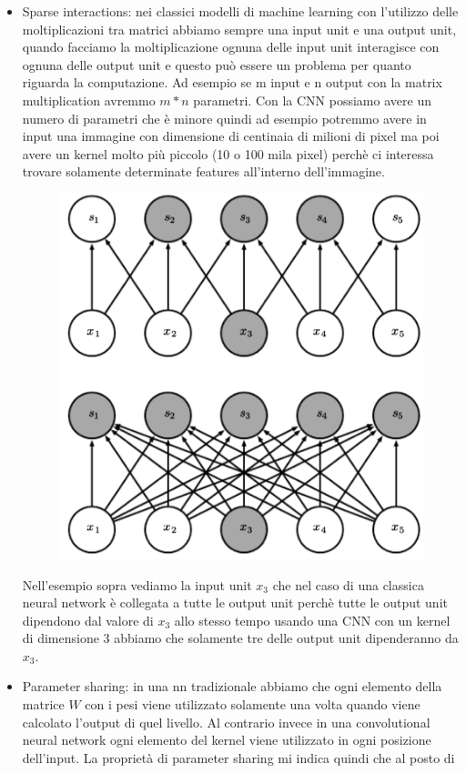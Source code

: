 \documentclass[14pt]{extreport}
\begin{document}
\begin{itemize}
	\item Sparse interactions: nei classici modelli di machine learning con l'utilizzo delle moltiplicazioni tra matrici 
	abbiamo sempre una input unit e una output unit, quando facciamo la moltiplicazione ognuna delle input unit interagisce con ognuna delle 
	output unit e questo può essere un problema per quanto riguarda la computazione.
	Ad esempio se m input e n output con la matrix multiplication avremmo $m*n$ parametri. 
	Con la CNN possiamo avere un numero di parametri che è minore quindi ad esempio potremmo avere in input una immagine con dimensione di centinaia di milioni
	di pixel ma poi avere un kernel molto più piccolo (10 o 100 mila pixel) perchè ci interessa trovare solamente determinate features all'interno dell'immagine.
	\begin{figure}[H]
		\centering
		\includegraphics[width=0.7\linewidth]{411.jpeg}
		\end{figure}
	Nell'esempio sopra vediamo la input unit $x_3$ che nel caso di una classica neural network è collegata a tutte le output unit perchè
	tutte le output unit dipendono dal valore di $x_3$ allo stesso tempo usando una CNN con un kernel di dimensione 3 abbiamo che solamente tre delle output unit dipenderanno da $x_3$.
	\item Parameter sharing: in una nn tradizionale abbiamo che ogni elemento della matrice $W$ con i pesi viene utilizzato solamente una volta quando viene calcolato l'output di quel livello.
	Al contrario invece in una convolutional neural network ogni elemento del kernel viene utilizzato in ogni posizione dell'input. La proprietà di parameter sharing mi indica quindi che al posto di 

\end{itemize}
\end{document}

